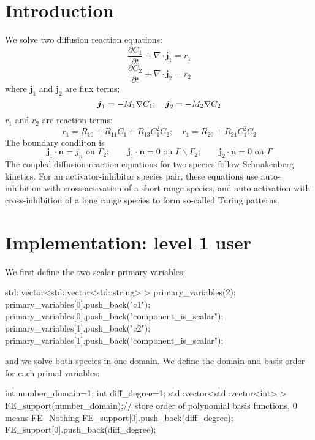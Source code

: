 \hypertarget{growth_Introduction}{}\section{Introduction}\label{growth_Introduction}
We solve two diffusion reaction equations\-: \[ \frac{\partial C_\text{1}}{\partial t}+\nabla\cdot\boldsymbol{j}_1=r_1 \] \[ \frac{\partial C_\text{2}}{\partial t}+\nabla\cdot\boldsymbol{j}_2=r_2 \] where $\boldsymbol{j}_1 $ and $\boldsymbol{j}_2 $ are flux terms\-: \[ \boldsymbol{j}_1=-M_1\nabla C_\text{1}; \quad \boldsymbol{j}_2=-M_2\nabla C_\text{2}\\ \] $r_1$ and $r_2$ are reaction terms\-: \[ r_1= R_{10}+R_{11}C_1+R_{13}C_1^2C_2; \quad r_1= R_{20}+R_{21}C_1^2C_2 \] The boundary condiiton is \[ \boldsymbol{j}_1\cdot\boldsymbol{n}=j_n \text{ on }\Gamma_2;\quad \quad \boldsymbol{j}_1\cdot\boldsymbol{n}=0 \text{ on }\Gamma \backslash \Gamma_2; \quad \quad \boldsymbol{j}_2\cdot\boldsymbol{n}=0 \text{ on }\Gamma \] The coupled diffusion-\/reaction equations for two species follow Schnakenberg kinetics. For an activator-\/inhibitor species pair, these equations use auto-\/inhibition with cross-\/activation of a short range species, and auto-\/activation with cross-\/inhibition of a long range species to form so-\/called Turing patterns.\hypertarget{growth_imple}{}\section{Implementation\-: level 1 user}\label{growth_imple}
We first define the two scalar primary variables\-: 
\begin{DoxyCode}
std::vector<std::vector<std::string> > primary\_variables(2);        
      primary\_variables[0].push\_back(\textcolor{stringliteral}{"c1"}); primary\_variables[0].push\_back(\textcolor{stringliteral}{"component\_is\_scalar"});
      primary\_variables[1].push\_back(\textcolor{stringliteral}{"c2"}); primary\_variables[1].push\_back(\textcolor{stringliteral}{"component\_is\_scalar"});
\end{DoxyCode}
 and we solve both species in one domain. We define the domain and basis order for each primal variables\-: 
\begin{DoxyCode}
\textcolor{keywordtype}{int} number\_domain=1;
\textcolor{keywordtype}{int} diff\_degree=1;
std::vector<std::vector<int> > FE\_support(number\_domain);\textcolor{comment}{// store order of polynomial basis functions, 0
       means FE\_Nothing   }
FE\_support[0].push\_back(diff\_degree);
FE\_support[0].push\_back(diff\_degree);
\end{DoxyCode}
